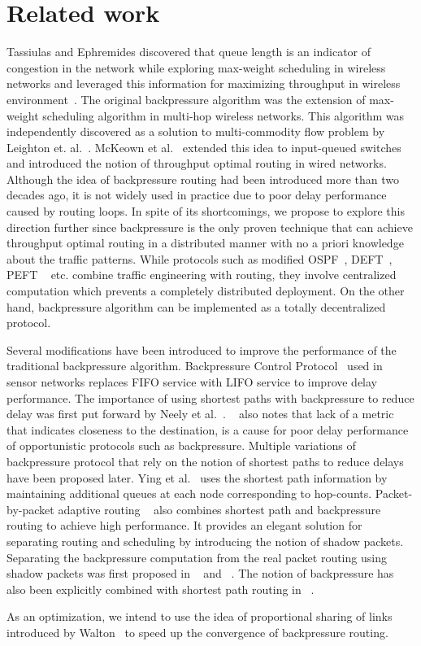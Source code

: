 \label{sec:related}
\section*{Related work}

Tassiulas and Ephremides discovered that queue length is an indicator of congestion in the network while exploring max-weight scheduling in wireless networks and leveraged this information for maximizing throughput in wireless environment~\cite{BP-orig}. The original backpressure algorithm was the extension of max-weight scheduling algorithm in multi-hop wireless networks. This algorithm was independently discovered as a solution to multi-commodity flow problem by Leighton et. al.~\cite{Leighton1}. McKeown et al.~\cite{nick1} extended this idea to input-queued switches and introduced the notion of throughput optimal routing in wired networks. Although the idea of backpressure routing had been introduced more than two decades ago, it is not widely used in practice due to poor delay performance caused by routing loops. In spite of its shortcomings, we propose to explore this direction further since backpressure is the only proven technique that can achieve throughput optimal routing in a distributed manner with no a priori knowledge about the traffic patterns. While protocols such as modified OSPF~\cite{mOSPF}, DEFT~\cite{DEFT}, PEFT ~\cite{PEFT} etc. combine traffic engineering with routing, they involve centralized computation which prevents a completely distributed deployment. On the other hand, backpressure algorithm can be implemented as a totally decentralized protocol.

Several modifications have been introduced to improve the performance of the traditional backpressure algorithm. Backpressure Control Protocol~\cite{BCP} used in sensor networks replaces FIFO service with LIFO service to improve delay performance. The importance of using shortest paths with backpressure to reduce delay was first put forward by Neely et al.~\cite{Neely1}. ~\cite{SP1} also notes that lack of a metric that indicates closeness to the destination, is a cause for poor delay performance of opportunistic protocols such as backpressure. Multiple variations of backpressure protocol that rely on the notion of shortest paths to reduce delays have been proposed later. Ying et al.~\cite{Austin1} uses the shortest path information by maintaining additional queues at each node corresponding to hop-counts. Packet-by-packet adaptive routing ~\cite{Srikant3} also combines shortest path and backpressure routing to achieve high performance. It provides an elegant solution for separating routing and scheduling by introducing the notion of shadow packets. Separating the backpressure computation from the real packet routing using shadow packets was first proposed in ~\cite{Srikant1} and ~\cite{Srikant2}. The notion of backpressure has also been explicitly combined with shortest path routing in ~\cite{BP-lcn}.

As an optimization, we intend to use the idea of proportional sharing of links introduced by Walton~\cite{walton} to speed up the convergence of backpressure routing.
